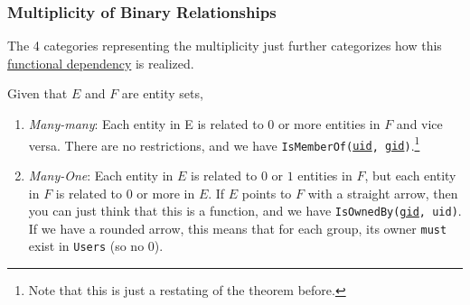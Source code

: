   \subsubsection{Multiplicity of Binary Relationships}

    The 4 categories representing the multiplicity just further categorizes how this \hyperref[def:functional-dependency]{functional dependency} is realized. 

    \begin{definition}
      \label{def:multiplicity-of-2-way-relationships}
      Given that $E$ and $F$ are entity sets, 
      \begin{enumerate}
        \item \textit{Many-many}: Each entity in E is related to $0$ or more entities in $F$ and vice versa. There are no restrictions, and we have \texttt{IsMemberOf(\underline{uid}, \underline{gid})}.\footnote{Note that this is just a restating of the theorem before.} 

        \begin{figure}[H]
          \centering 
          \caption{} 
          \label{fig:ismember}
        \end{figure}

        \item \textit{Many-One}: Each entity in $E$ is related to $0$ or $1$ entities in $F$, but each entity in $F$ is related to $0$ or more in $E$. If $E$ points to $F$ with a straight arrow, then you can just think that this is a function, and we have \texttt{IsOwnedBy(\underline{gid}, uid)}. If we have a rounded arrow, this means that for each group, its owner \texttt{must} exist in \texttt{Users} (so no $0$). 


\end{enumerate}
\end{definition}
